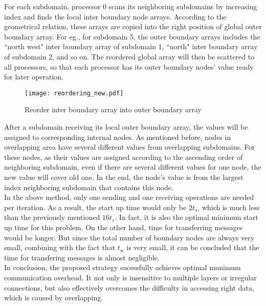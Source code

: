 \documentclass{sig-alternate}
\begin{document}
	For each subdomain, processor 0 scans its neighboring subdomains by increasing index and finds the local inter boundary 
	node arrays. According to the geometrical relation,
	these arrays are copied into the right position of global outer boundary array. For eg., for subdomain 5, the outer boundary
	arrays includes the ``north west" inter boundary array of subdomain 1, ``north" inter boundary array of subdomain 2, 
	and so on. The reordered global array will then be scattered to all processors, so that each processor has its outer 
	boundary nodes' value ready for later operation.\\ 
	\begin{figure}[htbp]
	  \centering
	  \texttt{[image: reordering\_new.pdf]}
	  \caption{Reorder inter boundary array into outer boundary array}
	  \label{Fig4}
	\end{figure}

	After a subdomain receiving its local outer boundary array, the values will be assigned to corresponding internal nodes. As 
	mentioned before, nodes in overlapping area have several different values from overlapping subdomains. For these nodes, 
	as their values are assigned according to the ascending order of neighboring subdomain, even if there are several different
	values for one node, the new value will cover old one. In the end, the node's value is from the largest index neighboring 
	subdomain that contains this node.\\  
	
	In the above method, only one sending and one receiving operations are needed per iteration. As a result, the start up time 
	would only be $2t_s$, which is much less than the previously mentioned $16t_s$. In fact, it is also the optimal 
	minimum 
	start up time for this problem. On the other hand, time for transferring messages would be longer. But since the total number 
	of boundary nodes are always very small, combining with the fact that $t_w$ is very small, it can be concluded that the 
	time for transfering messages is almost negligible.\\ 

	In conclusion, the proposed strategy sucessfully achieves optimal munimum communication overhead. It  
	not only is insensitive to multiple layers or irregular connections, but also effectively overcomes the difficulty in 
	accessing right data, which is caused by overlapping.\\
	
\end{document}
